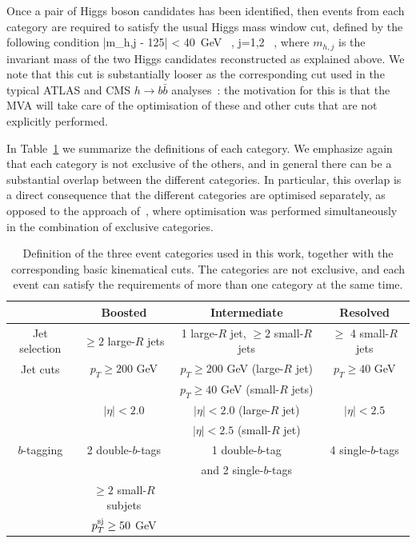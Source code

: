Once a pair of Higgs boson candidates has been identified,
then events from each category are required to satisfy the usual
Higgs mass window cut, defined by
the following condition
\be
|m_{h,j} - 125| < 40~{\rm GeV} \, , j=1,2 \, ,
\ee
where $m_{h,j}$ is the invariant mass of the two Higgs candidates
reconstructed as explained above.
%
We note that this cut is substantially looser as the corresponding
cut used in the typical ATLAS and CMS $h\to b\bar{b}$
analyses~\cite{Aad:2012gxa,Chatrchyan:2013zna}: the motivation
for this is that the MVA will take care of the optimisation of these
and other cuts that are not explicitly performed.


In Table~\ref{sec:categorisation} we summarize the definitions of each
category.
%
We emphasize again that each category is not exclusive of the others,
and in general there can be a substantial overlap
between the different categories.
%
In particular, this overlap is a direct consequence that
the different categories are optimised separately, as opposed
to the approach of~\cite{Gouzevitch:2013qca}, where optimisation
was performed simultaneously in the combination of exclusive categories.


\begin{table}[h]
  \centering
  \small
  \begin{tabular}{c|c|c|c}
    \hline
    &  Boosted  &  Intermediate  &  Resolved  \\
    \hline
    \hline 
    Jet selection  &  $\ge 2$ large-$R$ jets  & 1 large-$R$ jet, $\ge 2$ small-$R$
    jets  &  $\ge$ 4 small-$R$ jets \\
    \hline
    Jet cuts  & $p_T \ge 200$ GeV   &  $p_T \ge 200$ GeV (large-$R$ jet)
    &  $p_T \ge 40$ GeV \\
    &  & $p_T \ge 40$ GeV (small-$R$ jets)   &    \\
    &   $|\eta|<2.0$  & $|\eta|<2.0$ (large-$R$ jet) & $|\eta|<2.5$ \\
    &        & $|\eta|<2.5$ (small-$R$ jet)  &  \\
    \hline
    $b$-tagging  & 2 double-$b$-tags  & 1 double-$b$-tag & 4 single-$b$-tags \\
    &  & and 2 single-$b$-tags  &  \\
       & $\ge 2$ small-$R$ subjets  & &  \\
    &  $p_T^{\rm sj}\ge 50$ GeV &   &  \\
    \hline
    \end{tabular}
  \caption{\small Definition of the three event categories used in this
    work, together with the corresponding basic kinematical cuts.
    The categories are not exclusive, and each event can satisfy the
    requirements of more than one category at the same time.  
\label{sec:categorisation}
  }
\end{table}

